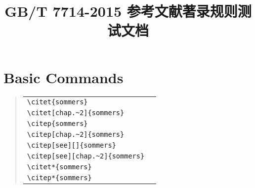 \documentclass[UTF8,a4paper,zihao=5]{ctexart}
\begin{document}
\title{GB/T 7714-2015 参考文献著录规则测试文档}
\date{}
\maketitle

\section{Basic Commands}
\begin{quote}
\begin{tabular}{l@{\quad$\Rightarrow$\quad}l}
  \verb|\citet{sommers}| & \citet{sommers}\\
  \verb|\citet[chap.~2]{sommers}| & \citet[chap.~2]{sommers}\\[0.5ex]
  \verb|\citep{sommers}| & \citep{sommers}\\
  \verb|\citep[chap.~2]{sommers}| & \citep[chap.~2]{sommers}\\
  \verb|\citep[see][]{sommers}| & \citep[see][]{sommers}\\
  \verb|\citep[see][chap.~2]{sommers}| & \citep[see][chap.~2]{sommers}\\[0.5ex]
  \verb|\citet*{sommers}| & \citet*{sommers}\\
  \verb|\citep*{sommers}| & \citep*{sommers}
\end{tabular}
\end{quote}

\nocite{*}


\end{document}
